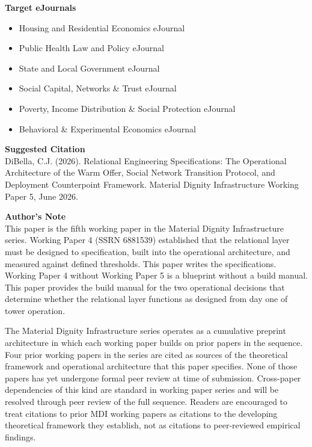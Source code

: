 \documentclass[12pt, letterpaper]{article}
\begin{document}
\vspace{8pt}
\noindent\textbf{Target eJournals}
\begin{itemize}[nosep, before={\vspace{-8pt}}, leftmargin=2em]
    \item Housing and Residential Economics eJournal
    \item Public Health Law and Policy eJournal
    \item State and Local Government eJournal
    \item Social Capital, Networks \& Trust eJournal
    \item Poverty, Income Distribution \& Social Protection eJournal
    \item Behavioral \& Experimental Economics eJournal
\end{itemize}

\vspace{8pt}
\noindent\textbf{Suggested Citation}\\[1pt]
DiBella, C.J. (2026). Relational Engineering Specifications: The Operational Architecture of the Warm Offer, Social Network Transition Protocol, and Deployment Counterpoint Framework. Material Dignity Infrastructure Working Paper 5, June 2026.

\newpage

\vspace{8pt}
\noindent\textbf{Author's Note}\\[1pt]
This paper is the fifth working paper in the Material Dignity Infrastructure series. Working Paper 4 (SSRN 6881539) established that the relational layer must be designed to specification, built into the operational architecture, and measured against defined thresholds. This paper writes the specifications. Working Paper 4 without Working Paper 5 is a blueprint without a build manual. This paper provides the build manual for the two operational decisions that determine whether the relational layer functions as designed from day one of tower operation.

The Material Dignity Infrastructure series operates as a cumulative preprint architecture in which each working paper builds on prior papers in the sequence. Four prior working papers in the series are cited as sources of the theoretical framework and operational architecture that this paper specifies. None of those papers has yet undergone formal peer review at time of submission. Cross-paper dependencies of this kind are standard in working paper series and will be resolved through peer review of the full sequence. Readers are encouraged to treat citations to prior MDI working papers as citations to the developing theoretical framework they establish, not as citations to peer-reviewed empirical findings.
\end{document}
